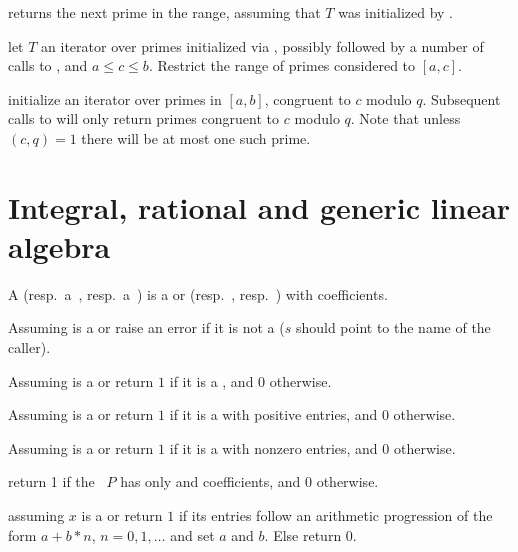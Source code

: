  returns the next prime in the range,
assuming that $T$ was initialized by .



 let $T$ an iterator
over primes initialized via , possibly
followed by a number of calls to , and $a \leq c \leq
b$. Restrict the range of primes considered to $[a,c]$.

 initialize an iterator over primes in $[a,b]$, congruent to $c$
modulo $q$. Subsequent calls to  will only return primes
congruent to $c$ modulo $q$. Note that unless $(c,q) = 1$ there will be at
most one such prime.

\section{Integral, rational and generic linear algebra}
 A  (resp.~a~,
resp.~a~) is a  or  (resp.~,
resp.~) with  coefficients.


 Assuming  is a 
or  raise an error if it is not a  ($s$ should point to the
name of the caller).

 Assuming  is a 
or  return $1$ if it is a , and $0$ otherwise.

 Assuming  is a 
or  return $1$ if it is a  with positive entries, and $0$
otherwise.

 Assuming  is a 
or  return $1$ if it is a  with nonzero entries, and $0$
otherwise.

 return 1 if the ~$P$ has only
 and  coefficients, and 0 otherwise.

 assuming $x$ is a 
or  return $1$ if its entries follow an arithmetic progression
of the form $a + b*n$, $n = 0, 1, \dots$ and set $a$ and $b$. Else return $0$.

